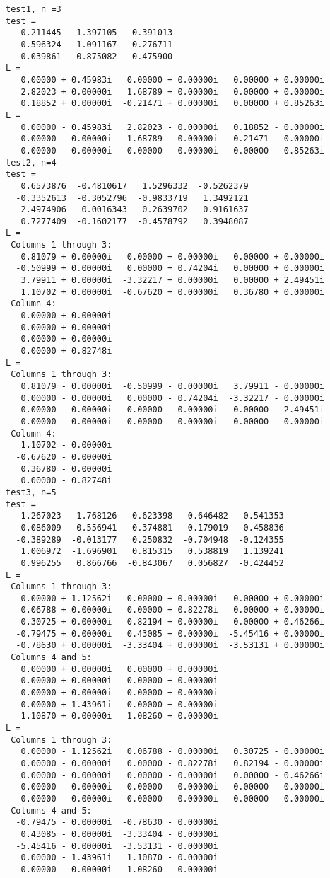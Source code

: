 \documentclass[10pt]{article}
\begin{document}
\begin{lstlisting}[language={},xleftmargin=5pt,frame=none]
test1, n =3
test =
  -0.211445  -1.397105   0.391013
  -0.596324  -1.091167   0.276711
  -0.039861  -0.875082  -0.475900
L =
   0.00000 + 0.45983i   0.00000 + 0.00000i   0.00000 + 0.00000i
   2.82023 + 0.00000i   1.68789 + 0.00000i   0.00000 + 0.00000i
   0.18852 + 0.00000i  -0.21471 + 0.00000i   0.00000 + 0.85263i
L =
   0.00000 - 0.45983i   2.82023 - 0.00000i   0.18852 - 0.00000i
   0.00000 - 0.00000i   1.68789 - 0.00000i  -0.21471 - 0.00000i
   0.00000 - 0.00000i   0.00000 - 0.00000i   0.00000 - 0.85263i
test2, n=4
test =
   0.6573876  -0.4810617   1.5296332  -0.5262379
  -0.3352613  -0.3052796  -0.9833719   1.3492121
   2.4974906   0.0016343   0.2639702   0.9161637
   0.7277409  -0.1602177  -0.4578792   0.3948087
L =
 Columns 1 through 3:
   0.81079 + 0.00000i   0.00000 + 0.00000i   0.00000 + 0.00000i
  -0.50999 + 0.00000i   0.00000 + 0.74204i   0.00000 + 0.00000i
   3.79911 + 0.00000i  -3.32217 + 0.00000i   0.00000 + 2.49451i
   1.10702 + 0.00000i  -0.67620 + 0.00000i   0.36780 + 0.00000i
 Column 4:
   0.00000 + 0.00000i
   0.00000 + 0.00000i
   0.00000 + 0.00000i
   0.00000 + 0.82748i
L =
 Columns 1 through 3:
   0.81079 - 0.00000i  -0.50999 - 0.00000i   3.79911 - 0.00000i
   0.00000 - 0.00000i   0.00000 - 0.74204i  -3.32217 - 0.00000i
   0.00000 - 0.00000i   0.00000 - 0.00000i   0.00000 - 2.49451i
   0.00000 - 0.00000i   0.00000 - 0.00000i   0.00000 - 0.00000i
 Column 4:
   1.10702 - 0.00000i
  -0.67620 - 0.00000i
   0.36780 - 0.00000i
   0.00000 - 0.82748i
test3, n=5
test =
  -1.267023   1.768126   0.623398  -0.646482  -0.541353
  -0.086009  -0.556941   0.374881  -0.179019   0.458836
  -0.389289  -0.013177   0.250832  -0.704948  -0.124355
   1.006972  -1.696901   0.815315   0.538819   1.139241
   0.996255   0.866766  -0.843067   0.056827  -0.424452
L =
 Columns 1 through 3:
   0.00000 + 1.12562i   0.00000 + 0.00000i   0.00000 + 0.00000i
   0.06788 + 0.00000i   0.00000 + 0.82278i   0.00000 + 0.00000i
   0.30725 + 0.00000i   0.82194 + 0.00000i   0.00000 + 0.46266i
  -0.79475 + 0.00000i   0.43085 + 0.00000i  -5.45416 + 0.00000i
  -0.78630 + 0.00000i  -3.33404 + 0.00000i  -3.53131 + 0.00000i
 Columns 4 and 5:
   0.00000 + 0.00000i   0.00000 + 0.00000i
   0.00000 + 0.00000i   0.00000 + 0.00000i
   0.00000 + 0.00000i   0.00000 + 0.00000i
   0.00000 + 1.43961i   0.00000 + 0.00000i
   1.10870 + 0.00000i   1.08260 + 0.00000i
L =
 Columns 1 through 3:
   0.00000 - 1.12562i   0.06788 - 0.00000i   0.30725 - 0.00000i
   0.00000 - 0.00000i   0.00000 - 0.82278i   0.82194 - 0.00000i
   0.00000 - 0.00000i   0.00000 - 0.00000i   0.00000 - 0.46266i
   0.00000 - 0.00000i   0.00000 - 0.00000i   0.00000 - 0.00000i
   0.00000 - 0.00000i   0.00000 - 0.00000i   0.00000 - 0.00000i
 Columns 4 and 5:
  -0.79475 - 0.00000i  -0.78630 - 0.00000i
   0.43085 - 0.00000i  -3.33404 - 0.00000i
  -5.45416 - 0.00000i  -3.53131 - 0.00000i
   0.00000 - 1.43961i   1.10870 - 0.00000i
   0.00000 - 0.00000i   1.08260 - 0.00000i

\end{lstlisting}
\end{document}
